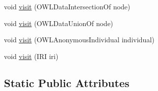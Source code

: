 \begin{DoxyCompactItemize}
\item 
void \hyperlink{classorg_1_1coode_1_1owlapi_1_1latex_1_1_latex_object_visitor_afe8c5b222f6fa5df477d02802299c98e}{visit} (O\-W\-L\-Data\-Intersection\-Of node)
\item 
void \hyperlink{classorg_1_1coode_1_1owlapi_1_1latex_1_1_latex_object_visitor_af1e3e5fdcf18c60d3659693ad43ba7c0}{visit} (O\-W\-L\-Data\-Union\-Of node)
\item 
void \hyperlink{classorg_1_1coode_1_1owlapi_1_1latex_1_1_latex_object_visitor_a737d30bcf7c2de364ae6f9585ddf07d8}{visit} (O\-W\-L\-Anonymous\-Individual individual)
\item 
void \hyperlink{classorg_1_1coode_1_1owlapi_1_1latex_1_1_latex_object_visitor_ab12b99e1bffaba5070ff71e0939aa9a2}{visit} (I\-R\-I iri)
\end{DoxyCompactItemize}
\subsection*{Static Public Attributes}
